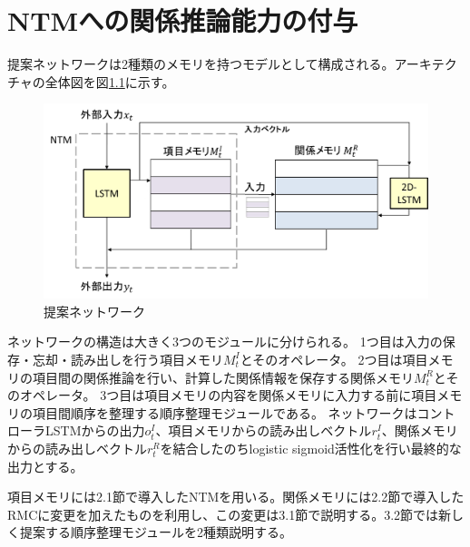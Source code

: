 \chapter{NTMへの関係推論能力の付与}
提案ネットワークは2種類のメモリを持つモデルとして構成される。アーキテクチャの全体図を図\ref{fig:teian_net}に示す。

\begin{figure}[t]
	\centering
	\includegraphics[width=\linewidth]{./figure/img_slide/teian_net.png}
	\caption{提案ネットワーク}
	\label{fig:teian_net}
\end{figure}

ネットワークの構造は大きく3つのモジュールに分けられる。
1つ目は入力の保存・忘却・読み出しを行う項目メモリ$M^I_t$とそのオペレータ。
2つ目は項目メモリの項目間の関係推論を行い、計算した関係情報を保存する関係メモリ$M^R_t$とそのオペレータ。
3つ目は項目メモリの内容を関係メモリに入力する前に項目メモリの項目間順序を整理する順序整理モジュールである。
ネットワークはコントローラLSTMからの出力$o^I_t$、項目メモリからの読み出しベクトル$r^I_t$、関係メモリからの読み出しベクトル$r^R_t$を結合したのちlogistic sigmoid活性化を行い最終的な出力とする。

項目メモリには2.1節で導入したNTMを用いる。関係メモリには2.2節で導入したRMCに変更を加えたものを利用し、この変更は3.1節で説明する。3.2節では新しく提案する順序整理モジュールを2種類説明する。

